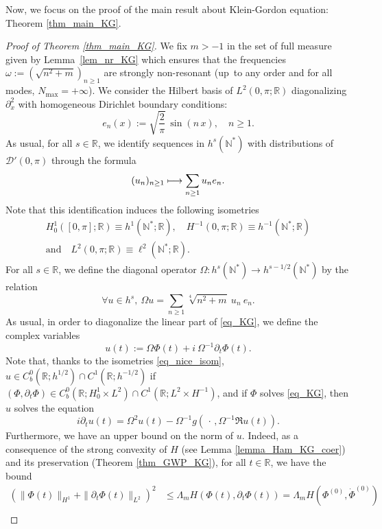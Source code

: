 \documentclass[JEP,XML,SOM,Unicode,NoEqCountersInSection,published]{cedram}
\newcommand\mto{\mathchoice{\longmapsto}{\mapsto}{\mapsto}{\mapsto}}
\theoremstyle{definition}
\begin{document}
Now, we focus on the proof of the main result about Klein-Gordon equation: Theorem \ref{thm_main_KG}.
\begin{proof}[Proof of Theorem \ref{thm_main_KG}] We fix $m>-1$ in the set of full measure given by Lemma~\ref{lem_nr_KG} which ensures that the frequencies $\omega:=(\sqrt{n^2+m})_{n\geq 1}$ are strongly non-resonant (up~to any order and for all modes, \ie $N_{\max}=+\infty$). We consider the Hilbert basis of $L^2(0,\pi;\mathbb{R})$ diagonalizing $\partial_x^2$ with homogeneous Dirichlet boundary conditions:
\[
e_n(x):= \sqrt{\frac2\pi}\, \sin(n \, x), \quad n\geq 1.
\]
As usual, for all $s\in \mathbb{R}$, we identify sequences in $h^{s}(\mathbb{N}^*)$ with distributions of $\mathcal{D}'(0,\pi)$ through the formula
\[
(u_n)_{n\geq 1} \mto \sum_{n\geq 1} u_n e_n.
\]
Note that this identification induces the following isometries
\begin{multline}
\label{eq_nice_isom}
H^1_0([0,\pi];\mathbb{R}) \equiv h^1(\mathbb{N}^*;\mathbb{R}), \quad H^{-1}(0,\pi;\mathbb{R}) \equiv h^{-1}(\mathbb{N}^*;\mathbb{R})\\ \text{and} \quad L^{2}(0,\pi;\mathbb{R}) \equiv \ell^2(\mathbb{N}^*;\mathbb{R}).
\end{multline}
For all $s\in \mathbb{R}$, we define the diagonal operator $\Omega:h^s(\mathbb{N}^*) \to h^{s-1/2}(\mathbb{N}^*)$ by the relation
\[
\forall u\in h^s, \ \Omega u = \sum_{n\geq 1} \sqrt[4]{n^2+m} \ u_n \ e_n.
\]
As usual, in order to diagonalize the linear part of \eqref{eq_KG}, we define the complex variables
\[
u(t):= \Omega \Phi(t)+i \ \Omega^{-1} \partial_t \Phi(t).
\]
Note that, thanks to the isometries \eqref{eq_nice_isom}, $u \in C^0_b(\mathbb{R}; h^{1/2}) \cap C^1(\mathbb{R}; h^{-1/2})$ if $(\Phi,\partial_t \Phi) \in C^0_b(\mathbb{R}; H^1_0 \times L^2) \cap C^1(\mathbb{R}; L^2 \times H^{-1})$, and if $\Phi$ solves \eqref{eq_KG}, then $u$ solves the equation%
\begin{equation}
\label{eq_ca_commence_a_ressembler_a_qqch}
i\partial_t u(t) = \Omega^2 u(t) - \Omega^{-1} g(\, \cdot\,,\Omega^{-1} \Re u(t)).
\end{equation}
Furthermore, we have an upper bound on the norm of $u$. Indeed, as a consequence of the strong convexity of $H$ (see Lemma \ref{lemma_Ham_KG_coer}) and its preservation (Theorem \ref{thm_GWP_KG}), for all $t\in \mathbb{R}$, we have the bound
\begin{equation*}
\begin{split}
(\| \Phi(t) \|_{H^1} + \| \partial_t \Phi(t) \|_{L^2})^2 & \leq \Lambda_m H(\Phi(t),\partial_t \Phi(t)) = \Lambda_m H(\Phi^{(0)},\dot{\Phi}^{(0)}) \\

\end{split}
\end{equation*}
\end{proof}
\end{document}
